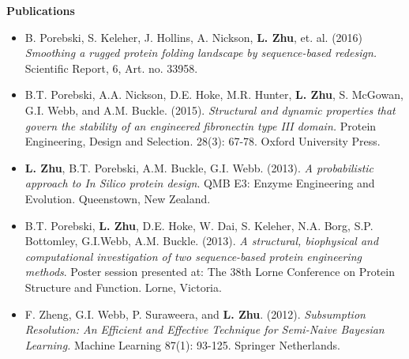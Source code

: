 \documentclass[a4paper,8pt,final]{memoir}
\newcommand{\Sep}{\vspace{1.5em}}
\newcommand{\SmallSep}{\vspace{0.5em}}
\newcommand{\CVSection}[1]
	{\Large\textbf{#1}\par
	\SmallSep\normalsize\normalfont}
\newcommand{\CVItem}[1]
	{\textbf{\color{RoyalBlue} #1}}
\begin{document}
%

\clearpage
\framebreak
\framebreak

\CVSection{Publications}
\begin{itemize}
    \item B. Porebski, S. Keleher, J. Hollins, A. Nickson, \textbf{L. Zhu}, et. al. (2016) \textit{Smoothing a rugged protein folding landscape by sequence-based redesign.} Scientific Report, 6, Art. no. 33958.
    \item B.T. Porebski, A.A. Nickson, D.E. Hoke, M.R. Hunter, \textbf{L. Zhu}, S. McGowan, G.I. Webb, and A.M. Buckle. (2015). \textit{Structural and dynamic properties that govern the stability of an engineered fibronectin type III domain.} Protein Engineering, Design and Selection. 28(3): 67-78. Oxford University Press.
    \item \textbf{L. Zhu}, B.T. Porebski, A.M. Buckle, G.I. Webb. (2013). \textit{A probabilistic approach to In Silico protein design}. QMB E3: Enzyme Engineering and Evolution. Queenstown, New Zealand.
    \item B.T. Porebski, \textbf{L. Zhu}, D.E. Hoke, W. Dai, S. Keleher, N.A. Borg, S.P. Bottomley, G.I.Webb, A.M. Buckle. (2013). \textit{A structural, biophysical and computational investigation of two sequence-based protein engineering methods}. Poster session presented at: The 38th Lorne Conference on Protein Structure and Function. Lorne, Victoria.
    \item F. Zheng, G.I. Webb, P. Suraweera, and \textbf{L. Zhu}. (2012). \textit{Subsumption Resolution: An Efficient and Effective Technique for Semi-Naive Bayesian Learning.} Machine Learning 87(1): 93-125. Springer Netherlands.
\end{itemize}
\Sep


\end{document}
